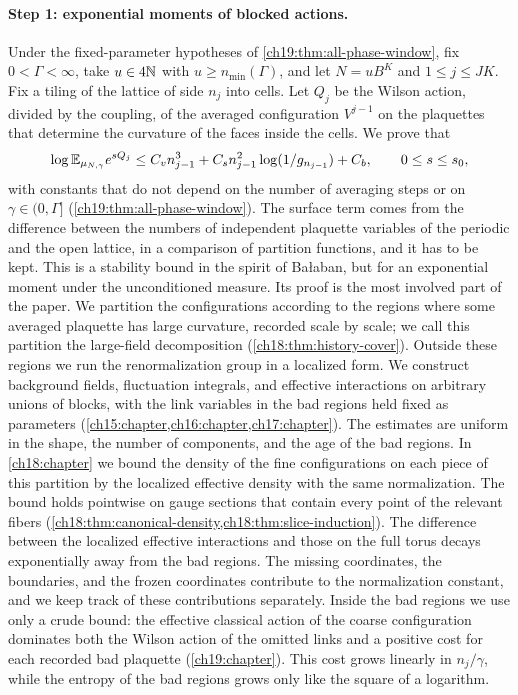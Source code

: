 \paragraph{Step 1: exponential moments of blocked actions.}
Under the fixed-parameter hypotheses of \cref{ch19:thm:all-phase-window}, fix $0<\Gamma<\infty$, take $u\in4\mathbb N$ with $u\ge n_{\min}(\Gamma)$, and let $N=uB^K$ and $1\le j\le JK$. Fix a tiling of the lattice of side $n_j$ into cells. Let $Q_j$ be the Wilson action, divided by the coupling, of the averaged configuration $V^{j-1}$ on the plaquettes that determine the curvature of the faces inside the cells. We prove that
\[
 \log\mathbb E_{\mu_{N,\gamma}}e^{sQ_j}\le C_vn_{j-1}^3+C_sn_{j-1}^2\log(1/g_{n_{j-1}})+C_b,\qquad0\le s\le s_0,
\]
with constants that do not depend on the number of averaging steps or on $\gamma\in(0,\Gamma]$ (\cref{ch19:thm:all-phase-window}). The surface term comes from the difference between the numbers of independent plaquette variables of the periodic and the open lattice, in a comparison of partition functions, and it has to be kept. This is a stability bound in the spirit of Bałaban, but for an exponential moment under the unconditioned measure. Its proof is the most involved part of the paper. We partition the configurations according to the regions where some averaged plaquette has large curvature, recorded scale by scale; we call this partition the large-field decomposition (\cref{ch18:thm:history-cover}). Outside these regions we run the renormalization group in a localized form. We construct background fields, fluctuation integrals, and effective interactions on arbitrary unions of blocks, with the link variables in the bad regions held fixed as parameters (\cref{ch15:chapter,ch16:chapter,ch17:chapter}). The estimates are uniform in the shape, the number of components, and the age of the bad regions. In \cref{ch18:chapter} we bound the density of the fine configurations on each piece of this partition by the localized effective density with the same normalization. The bound holds pointwise on gauge sections that contain every point of the relevant fibers (\cref{ch18:thm:canonical-density,ch18:thm:slice-induction}). The difference between the localized effective interactions and those on the full torus decays exponentially away from the bad regions. The missing coordinates, the boundaries, and the frozen coordinates contribute to the normalization constant, and we keep track of these contributions separately. Inside the bad regions we use only a crude bound: the effective classical action of the coarse configuration dominates both the Wilson action of the omitted links and a positive cost for each recorded bad plaquette (\cref{ch19:chapter}). This cost grows linearly in $n_j/\gamma$, while the entropy of the bad regions grows only like the square of a logarithm.

